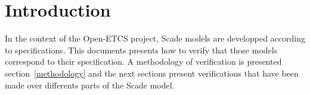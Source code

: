 \section{Introduction}
In the context of the Open-ETCS project, Scade models are developped
according to specifications. This documents presents how to verify
that those models correspond to their specification. A methodology of
verification is presented section~\ref{methodology} and the next
sections present verifications that have been made over differents
parts of the Scade model.

